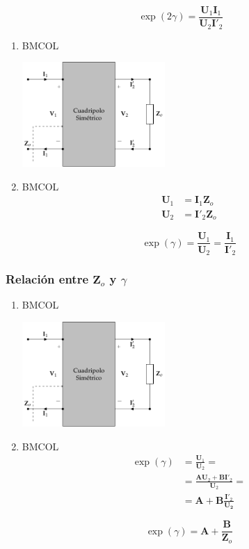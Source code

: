 \[
  \exp(2\gamma) = \frac{\mathbf{U}_1\mathbf{I}_1}{\mathbf{U}_2\mathbf{I}'_2}
\]

\begin{enumerate}
\item \hfill{}\textsc{BMCOL}
\label{sec:org884522a}
\begin{center}
\includegraphics[height=4cm]{../figs/cuadripolo_impedancia_caracteristica.pdf}
\end{center}

\item \hfill{}\textsc{BMCOL}
\label{sec:org13d5d40}
\begin{align*}
  \mathbf{U}_1 &= \mathbf{I}_1 \mathbf{Z}_o\\
  \mathbf{U}_2 &= \mathbf{I}'_2 \mathbf{Z}_o
\end{align*}

\[
  \boxed{\exp(\gamma) = \frac{\mathbf{U}_1}{\mathbf{U}_2} = \frac{\mathbf{I}_1}{\mathbf{I}'_2}}
\]
\end{enumerate}


\subsubsection{Relación entre \(\mathbf{Z}_o\) y \(\gamma\)}
\label{sec:orgba47dd9}
\begin{enumerate}
\item \hfill{}\textsc{BMCOL}
\label{sec:org93db8e6}
\begin{center}
\includegraphics[height=4cm]{../figs/cuadripolo_impedancia_caracteristica.pdf}
\end{center}

\item \hfill{}\textsc{BMCOL}
\label{sec:org51048e6}
\begin{align*}
  \exp(\gamma) &= \frac{\mathbf{U}_1}{\mathbf{U}_2} =\\
               &= \frac{\mathbf{A}\mathbf{U}_2 + \mathbf{B}\mathbf{I}'_2}{\mathbf{U}_2} = \\
               &= \mathbf{A} + \mathbf{B}\frac{\mathbf{I}'_2}{\mathbf{U_2}}
\end{align*}

\[
  \boxed{\exp(\gamma) = \mathbf{A} + \frac{\mathbf{B}}{\mathbf{Z}_o}}
\]
\end{enumerate}

